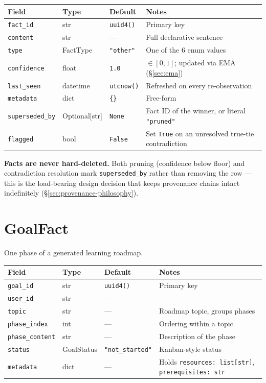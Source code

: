 \documentclass[11pt,a4paper]{report}
\newcommand{\code}[1]{\texttt{\small #1}}
\begin{document}
\begin{longtable}{lll L{6cm}}
\toprule
\textbf{Field} & \textbf{Type} & \textbf{Default} & \textbf{Notes} \\
\midrule
\endhead
\code{fact\_id} & str & \code{uuid4()} & Primary key \\
\code{content} & str & --- & Full declarative sentence \\
\code{type} & FactType & \code{"other"} & One of the 6 enum values \\
\code{confidence} & float & \code{1.0} & $\in [0,1]$; updated via EMA (\S\ref{sec:ema}) \\
\code{last\_seen} & datetime & \code{utcnow()} & Refreshed on every re-observation \\
\code{metadata} & dict & \code{\{\}} & Free-form \\
\code{superseded\_by} & Optional[str] & \code{None} & Fact ID of the winner, or literal \code{"pruned"} \\
\code{flagged} & bool & \code{False} & Set \code{True} on an unresolved true-tie contradiction \\
\bottomrule
\end{longtable}

\textbf{Facts are never hard-deleted.} Both pruning (confidence below floor) and contradiction resolution mark \code{superseded\_by} rather than removing the row — this is the load-bearing design decision that keeps provenance chains intact indefinitely (\S\ref{sec:provenance-philosophy}).

\section{GoalFact}
One phase of a generated learning roadmap.

\begin{longtable}{lll L{6cm}}
\toprule
\textbf{Field} & \textbf{Type} & \textbf{Default} & \textbf{Notes} \\
\midrule
\endhead
\code{goal\_id} & str & \code{uuid4()} & Primary key \\
\code{user\_id} & str & --- & \\
\code{topic} & str & --- & Roadmap topic, groups phases \\
\code{phase\_index} & int & --- & Ordering within a topic \\
\code{phase\_content} & str & --- & Description of the phase \\
\code{status} & GoalStatus & \code{"not\_started"} & Kanban-style status \\
\code{metadata} & dict & --- & Holds \code{resources: list[str]}, \code{prerequisites: str} \\
\bottomrule
\end{longtable}
\end{document}
